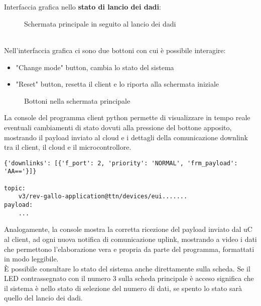 \\\\Interfaccia grafica nello \textbf{stato di lancio dei dadi}:
\begin{figure}[h!]
    \centering
    \caption{Schermata principale in seguito al lancio dei dadi}
    \label{fig:RollStateON}
\end{figure}
\\Nell'interfaccia grafica ci sono due bottoni con cui è possibile interagire:
\begin{itemize}
    \item "Change mode" button, cambia lo stato del sistema
    \item "Reset" button, resetta il client e lo riporta alla schermata iniziale
\end{itemize}
\begin{figure}[h!]
    \centering
    \caption{Bottoni nella schermata principale}
    \label{fig:HomePageButtons}
\end{figure}

La console del programma client python permette di visualizzare in tempo reale eventuali cambiamenti di stato dovuti alla pressione del bottone apposito, 
mostrando il payload inviato al cloud e i dettagli della comunicazione downlink tra il client, il cloud e il microcontrollore.

\begin{verbatim}
{'downlinks': [{'f_port': 2, 'priority': 'NORMAL', 'frm_payload': 'AA=='}]}

topic:
    v3/rev-gallo-application@ttn/devices/eui.......
payload:
    ...
\end{verbatim}

Analogamente, la console mostra la corretta ricezione del payload inviato dal uC al client, ad ogni nuova notifica di comunicazione uplink, 
mostrando a video i dati che permettono l'elaborazione vera e propria da parte del programma, formattati in modo leggibile.\\


È possibile consultare lo stato del sistema anche direttamente sulla scheda. Se il LED contrassegnato con il numero 3 sulla scheda principale 
è acceso significa che il sistema è nello stato di selezione del numero di dati, se spento lo stato sarà quello del lancio dei dadi. %












